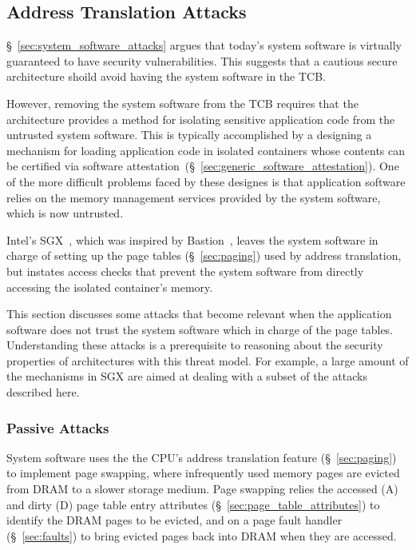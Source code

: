 \subsection{Address Translation Attacks}
\label{sec:address_translation_attacks}

\S~\ref{sec:system_software_attacks} argues that today's system software is
virtually guaranteed to have security vulnerabilities. This suggests that a
cautious secure architecture shoild avoid having the system software in the
TCB.

However, removing the system software from the TCB requires that the
architecture provides a method for isolating sensitive application code from
the untrusted system software. This is typically accomplished by a designing a
mechanism for loading application code in isolated containers whose contents
can be certified via software
attestation~(\S~\ref{sec:generic_software_attestation}). One of the more
difficult problems faced by these designes is that application software relies
on the memory management services provided by the system software, which is now
untrusted.

Intel's SGX~\cite{mckeen2013sgx, anati2013sgx}, which was inspired by
Bastion~\cite{champagne2010bastion}, leaves the system software in charge of
setting up the page tables (\S~\ref{sec:paging}) used by address translation,
but instates access checks that prevent the system software from directly
accessing the isolated container's memory.

This section discusses some attacks that become relevant when the application
software does not trust the system software which in charge of the page tables.
Understanding these attacks is a prerequisite to reasoning about the security
properties of architectures with this threat model. For example, a large amount
of the mechanisms in SGX are aimed at dealing with a subset of the attacks
described here.


\subsubsection{Passive Attacks}
\label{sec:fault_tracking_attacks}

System software uses the the CPU's address translation feature
(\S~\ref{sec:paging}) to implement page swapping, where infrequently used
memory pages are evicted from DRAM to a slower storage medium. Page swapping
relies the accessed (A) and dirty (D) page table entry attributes
(\S~\ref{sec:page_table_attributes}) to identify the DRAM pages to be evicted,
and on a page fault handler (\S~\ref{sec:faults}) to bring evicted pages back
into DRAM when they are accessed.

